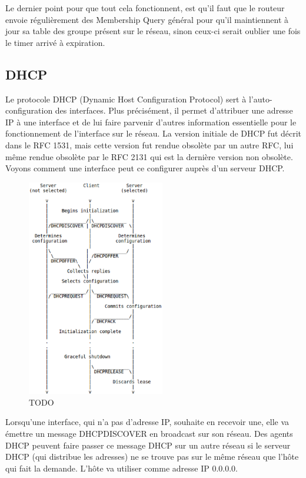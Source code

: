 Le dernier point pour que tout cela fonctionnent, est qu'il faut que le routeur envoie
régulièrement des Membership Query général pour qu'il maintiennent à jour sa table des
groupe présent sur le réseau, sinon ceux-ci serait oublier une fois le timer arrivé à expiration.

\subsection{DHCP}
Le protocole DHCP (Dynamic Host Configuration Protocol) sert à l'auto-configuration
des interfaces. Plus précisément, il  permet d'attribuer une adresse IP à une
interface et de lui faire parvenir d'autres information essentielle pour le
fonctionnement de l'interface sur le réseau. La version initiale de DHCP fut décrit
dans le RFC 1531\cite{url-RFC-DHCP1}, mais cette version fut rendue obsolète par un autre
RFC, lui même rendue obsolète par le RFC 2131\cite{url-RFC-DHCP2} qui est la dernière version non
obsolète. Voyons comment une interface peut ce configurer auprès d'un serveur DHCP.

\begin{figure}
\centering
\includegraphics[width=6cm]{./pics/timeline_dhcp.eps}
\caption{TODO}
\label{fig:timelinedhcp}
\end{figure}

Lorsqu'une interface, qui n'a pas d'adresse IP, souhaite en recevoir une, elle
va émettre un message DHCPDISCOVER en broadcast sur son réseau. Des agents DHCP
peuvent faire passer
ce message DHCP sur un autre réseau si le serveur DHCP (qui distribue les
adresses) ne se trouve pas sur le même réseau que l'hôte qui fait la demande.
L'hôte va utiliser comme adresse IP 0.0.0.0.

